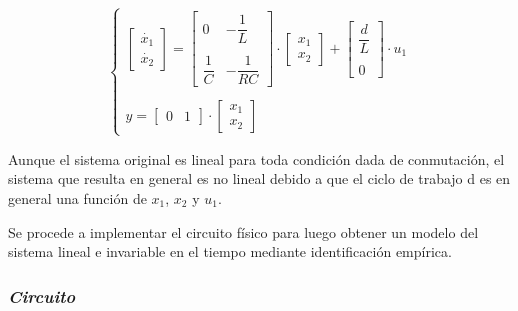 \vspace{-0.5cm}
\begin{equation}
    \begin{cases}
        \begin{bmatrix}
            \dot{x_1}\\
            \dot{x_2}
        \end{bmatrix}
        =
        \begin{bmatrix}
            0  &   -\dfrac{1}{L}\\
            \\
            \dfrac{1}{C} & -\dfrac{1}{RC}
        \end{bmatrix}
        \cdot
        \begin{bmatrix}
            x_1 \\
            x_2
        \end{bmatrix}
        +
        \begin{bmatrix}
            \dfrac{d}{L} \\
            \\
            0
        \end{bmatrix}
        \cdot
        u_1 
        \\
        \\
        y =
        \begin{bmatrix}
            0 & 1
        \end{bmatrix}
        \cdot
        \begin{bmatrix}
            x_1 \\
            x_2
        \end{bmatrix}

    \end{cases}
\end{equation}

Aunque el sistema original es lineal para toda condición dada de conmutación, el sistema que resulta 
en general es no lineal debido a que el ciclo de trabajo d es en general una función de $x_1$, $x_2$ y $u_1$. \parencite{RASHID}

Se procede a implementar el circuito físico para luego obtener un modelo del sistema lineal e invariable en el tiempo mediante
identificación empírica.

\subsubsection*{\it{Circuito}}
\vspace{-0.25cm}

